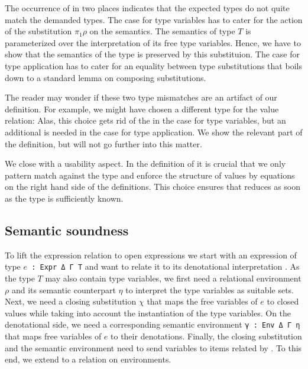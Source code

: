 \documentclass[acmsmall,anonymous,review,screen]{acmart}
\begin{document}
The occurrence of {\Asubst} in two places indicates that the expected types do not quite
match the demanded types.
The case for type variables has to cater for the action of the
substitution $\pi_1\rho$ on the semantics. The semantics of type $T$
is parameterized over the interpretation of its free type
variables. Hence, we have to show that the semantics of the type is
preserved by this substituion.
\TFsubstVarPreservesType
The case for type application has to cater for an equality between
type substitutions that boils down to a standard lemma on composing
substitutions.
\LogicallemmaOne

The reader may wonder if these two type mismatches are an
artifact of our definition. For example, we might have chosen a
different type for the value relation:
\LogicalVariationMCVType
Alas, this choice gets rid of the {\Asubst} in the case for type
variables, but an additional {\Asubst} is needed in the case for type
application. We show the relevant part of the definition, but will not go further into this matter.
\LogicalVariationMCVBodyUniversal

We close with a usability aspect.
In the definition of {\AVSem} it is crucial that we only pattern match
against the type and enforce the structure of values by equations on
the right hand side of the definitions. This choice ensures that {\AVSem}
reduces as soon as the type is sufficiently known.

\subsection{Semantic soundness}
\label{sec:relat-open-expr}

To lift the expression relation {\AESem} to open expressions we start
with an expression of type \texttt{$e$ : Expr Δ Γ T} and want to relate it
to its denotational interpretation . As the type $T$
may also contain type variables, we first need a relational
environment $\rho$ and its semantic counterpart $\eta$ to interpret
the type variables as suitable sets.
Next, we need a closing substitution $\chi$ that maps the free
variables of $e$ to closed values while taking into account the
instantiation of the type variables. On the denotational side, we need
a corresponding semantic environment \texttt{γ : Env Δ Γ η} that maps
free variables of $e$ to their denotations. Finally, the closing
substitution and the semantic environment need to send variables to
items related by {\AVSem}. To this end, we extend {\AVSem} to a
relation {\AGSem} on environments.
\end{document}
